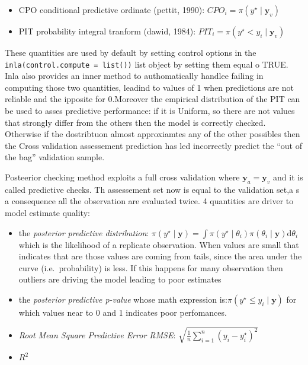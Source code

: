 \documentclass[
  12pt,
  a4paper,
  oneside]{book}
\newcommand{\passthrough}[1]{#1}
\providecommand{\tightlist}{%
  \setlength{\itemsep}{0pt}\setlength{\parskip}{0pt}}
\theoremstyle{definition}
\theoremstyle{definition}
\theoremstyle{definition}
\theoremstyle{remark}
\begin{document}
\begin{itemize}
\tightlist
\item
  CPO conditional predictive ordinate (pettit, 1990): \(CPO_{i} = \pi(y^{\star} \mid \boldsymbol{y}_{v})\)
\item
  PIT probability integral tranform (dawid, 1984): \(PIT_{i} = \pi(y^{\star} < y_{i} \mid \boldsymbol{y}_{v})\)
\end{itemize}

These quantities are used by default by setting control options in the \passthrough{\lstinline!inla(control.compute = list())!} list object by setting them equal o TRUE. Inla also provides an inner method to authomatically handlee failing in computing those two quantities, leadind to values of 1 when predictions are not reliable and the ipposite for 0.Moreover the empirical distribution of the PIT can be used to asses predictive performance: if it is Uniform, so there are not values that strongly differ from the others then the model is correctly checked. Otherwise if the dostribtuon almost approxiamtes any of the other possibles then the Cross validation assessement prediction has led incorrectly predict the ``out of the bag'' validation sample.

Posteerior checking method exploits a full cross validation where \(\boldsymbol{y}_{a} = \boldsymbol{y}_{v}\) and it is called predictive checks. Th assessement set now is equal to the validation set,a s a consequence all the observation are evaluated twice. 4 quantities are driver to model estimate quality:

\begin{itemize}
\tightlist
\item
  the \emph{posterior predictive distribution}: \(\pi(y^{\star} \mid \boldsymbol{y}) = \int \pi(y^{\star} \mid \theta_{i})\pi({\theta_{i}} \mid \boldsymbol{y})\mathrm{d}\theta_{i}\) which is the likelihood of a replicate observation. When values are small that indicates that are those values are coming from tails, since the area under the curve (i.e.~probability) is less. If this happens for many observation then outliers are driving the model leading to poor estimates
\item
  the \emph{posterior predictive p-value} whose math expression is:\(\pi(y^{\star} \leq y_{i} \mid \boldsymbol{y})\) for which values near to 0 and 1 indicates poor perfomances.
\item
  \emph{Root Mean Square Predictive Error RMSE}: \(\sqrt{\frac{1}{n} \sum_{i=1}^{n}(y_{i}-{y}^{\star}_{i})^{2}}\)
\item
  \(R^2\)
\end{itemize}
\end{document}
